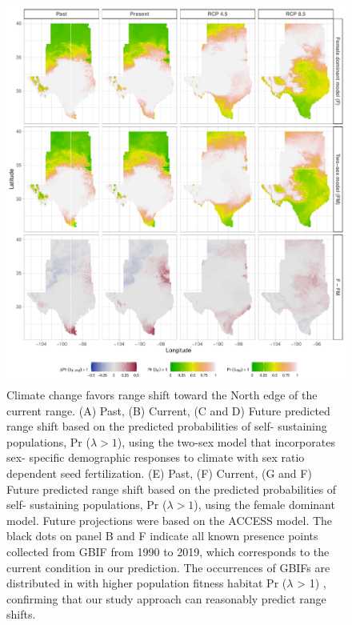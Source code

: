 \documentclass[12pt]{article}\usepackage[]{graphicx}\usepackage[dvipsnames]{xcolor}
\begin{document}
\begin{figure}[H]
  \begin{center}
    \includegraphics[width=0.95\linewidth]{Figures/Fig_geoPrlambdaacc.pdf}
  \caption{Climate change favors range shift toward the North edge of the current range.
  (A) Past, (B) Current, (C and D) Future predicted range shift based on the predicted probabilities of self- sustaining populations, Pr ($\lambda > 1$), using the two-sex model that incorporates sex- specific demographic responses to climate with sex ratio dependent seed fertilization.
  (E) Past, (F) Current, (G and F) Future  predicted range shift based on the predicted probabilities of self- sustaining populations, Pr ($\lambda > 1$), using the female dominant model.
  Future projections were based on the  ACCESS model.
  The black dots on panel B and F indicate all known presence points collected from GBIF from 1990 to 2019, which corresponds to the current condition in our prediction. 
  The occurrences of GBIFs are distributed in with higher population fitness habitat Pr ($\lambda$ > 1) , confirming that our study approach can reasonably predict range shifts.}
  \label{Sup:geoprojcmc}
  \end{center}
\end{figure}
\end{document}
